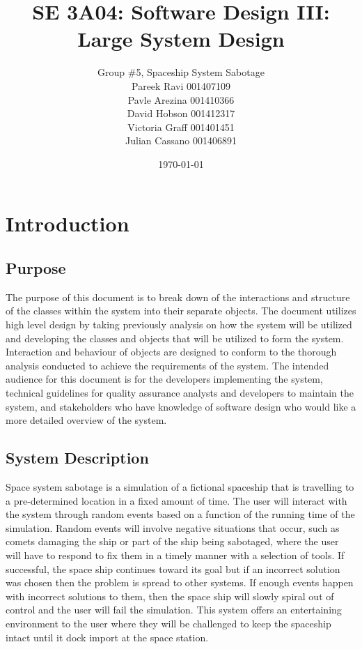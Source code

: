 \documentclass[12pt, titlepage]{article}
\title{SE 3A04: Software Design III: Large System Design}
\author{Group \#5, Spaceship System Sabotage %
		\\Pareek Ravi 001407109
		\\Pavle Arezina 001410366
		\\David Hobson 001412317
		\\Victoria Graff 001401451
		\\Julian Cassano 001406891
}
\date{\today}
\newcommand\tab[1][1cm]{\hspace*{#1}}
\begin{document}
\maketitle	
{}
\tableofcontents
\listoftables
\listoffigures
\newpage

\section{Introduction}
\label{sec:introduction}

\subsection{Purpose}
\label{sub:purpose}
\tab The purpose of this document is to break down of the interactions and structure of the classes within the system into their separate objects. The document utilizes high level design by taking previously analysis on how the system will be utilized and developing the classes and objects that will be utilized to form the system. Interaction and behaviour of objects are designed to conform to the thorough analysis conducted to achieve the requirements of the system.  The intended audience for this document is for the developers implementing the system, technical guidelines for quality assurance analysts and developers to maintain the system, and stakeholders who have knowledge of software design who would like a more detailed overview of the system.

\subsection{System Description}
\label{sub:system_description}
\tab Space system sabotage is a simulation of a fictional spaceship that is travelling to a pre-determined location in a fixed amount of time. The user will interact with the system through random events based on a function of the running time of the simulation. Random events will involve negative situations that occur, such as comets damaging the ship or part of the ship being sabotaged, where the user will have to respond to fix them in a timely manner with a selection of tools. If successful, the space ship continues toward its goal but if an incorrect solution was chosen then the problem is spread to other systems. If enough events happen with incorrect solutions to them, then the space ship will slowly spiral out of control and the user will fail the simulation. This system offers an entertaining environment to the user where they will be challenged to keep the spaceship intact until it dock import at the space station.
\end{document}
